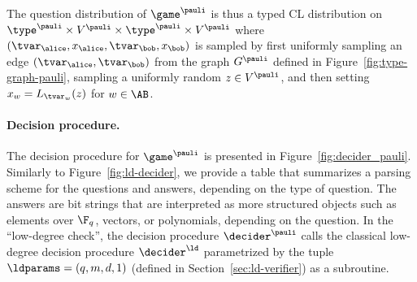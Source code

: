 The question distribution of $\game^\pauli$ is thus a typed CL distribution on
$\type^\pauli \times V^\pauli \times \type^\pauli \times V^\pauli$ where
$(\tvar_\alice,x_\alice,\tvar_\bob,x_\bob)$ is sampled by first uniformly
sampling an edge $(\tvar_\alice,\tvar_\bob)$ from the graph $G^\pauli$ defined
in Figure~\ref{fig:type-graph-pauli}, sampling a uniformly random $z \in
V^\pauli$, and then setting $x_w = L_{\tvar_w}(z)$ for $w \in \AB$.





\paragraph{Decision procedure.}
The decision procedure for $\game^\pauli$ is presented in
Figure~\ref{fig:decider_pauli}.
Similarly to Figure~\ref{fig:ld-decider}, we provide a table that summarizes a
parsing scheme for the questions and answers, depending on the type of question.
The answers are bit strings that are interpreted as more structured objects such
as elements over $\F_q$, vectors, or polynomials, depending on the question.
In the ``low-degree check'', the decision procedure $\decider^\pauli$ calls the
classical low-degree decision procedure $\decider^\ld$ parametrized by the tuple
$\ldparams = (q,m,d,1)$ (defined in Section~\ref{sec:ld-verifier}) as a
subroutine.


